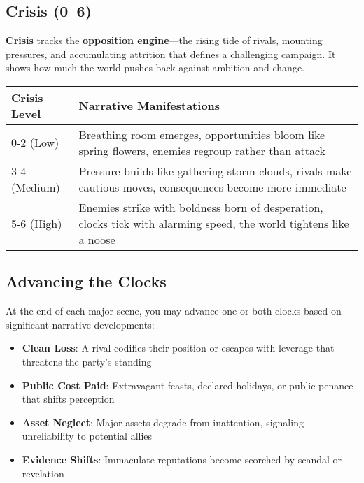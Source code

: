 \subsection*{Crisis (0--6)}

\textbf{Crisis} tracks the \textbf{opposition engine}---the rising tide of rivals, mounting pressures, and accumulating attrition that defines a challenging campaign. It shows how much the world pushes back against ambition and change.

\begin{fatebox}
\begin{tabularx}{\textwidth}{lX}
\toprule
\textbf{Crisis Level} & \textbf{Narrative Manifestations} \\
\midrule
0-2 (Low) & Breathing room emerges, opportunities bloom like spring flowers, enemies regroup rather than attack \\
3-4 (Medium) & Pressure builds like gathering storm clouds, rivals make cautious moves, consequences become more immediate \\
5-6 (High) & Enemies strike with boldness born of desperation, clocks tick with alarming speed, the world tightens like a noose \\
\bottomrule
\end{tabularx}
\end{fatebox}

\subsection*{Advancing the Clocks}

At the end of each major scene, you may advance one or both clocks based on significant narrative developments:

\begin{itemize}
    \item \textbf{Clean Loss}: A rival codifies their position or escapes with leverage that threatens the party's standing
    \item \textbf{Public Cost Paid}: Extravagant feasts, declared holidays, or public penance that shifts perception
    \item \textbf{Asset Neglect}: Major assets degrade from inattention, signaling unreliability to potential allies
    \item \textbf{Evidence Shifts}: Immaculate reputations become scorched by scandal or revelation
\end{itemize}

